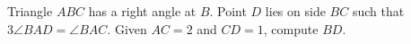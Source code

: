 Triangle $ABC$ has a right angle at $B$. Point $D$ lies on side $BC$ such that $3\angle{BAD}=\angle{BAC}$. Given $AC=2$ and $CD=1$, compute $BD$.